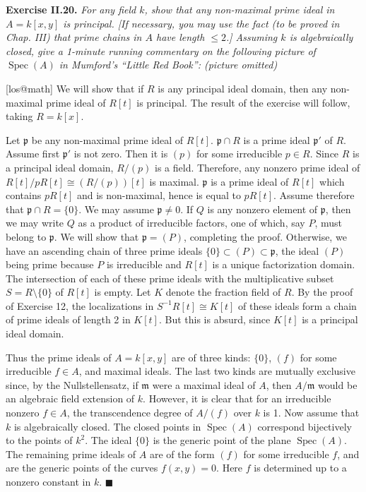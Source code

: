 \documentclass{article}
\makeatletter
\newcommand\<{\triangleleft}
\newcommand{\m}{\ensuremath{\mathfrak{m}}}
\newcommand\p{\mathfrak{p}}
\DeclareMathOperator{\spec}{Spec}
\newenvironment{exercise}[1]{\gdef\currentEx{#1}\begin{trivlist}\item[]%
                \textbf{Exercise #1.} \it}{\end{trivlist}}
\newenvironment{solution}[1]{\def\x{#1}\begin{trivlist}\item[]\hspace*{-.5em}[\x]}
                {\hspace*{\fill} $\blacksquare$
                \protected@write0{}{\currentEx, \x}
                \end{trivlist}}
\makeatother
\begin{document}
 \begin{exercise}{II.20}
   For any field $k$, show that any non-maximal prime ideal in $A=k[x,y]$ is principal.
   [If necessary, you may use the fact (to be proved in Chap. III) that prime chains in
   $A$ have length $\leq 2$.] Assuming $k$ is algebraically closed, give a 1-minute
   running commentary on the following picture of $\spec(A)$ in Mumford's ``Little Red
   Book'': (picture omitted)
 \end{exercise}
 \begin{solution}{los@math}
   We will show that if $R$ is any principal ideal domain, then any non-maximal prime
   ideal of $R[t]$ is principal. The result of the exercise will follow, taking $R=k[x]$.

   Let $\p$ be any non-maximal prime ideal of $R[t]$. $\p \cap R$ is a prime ideal $\p'$
   of $R$. Assume first $\p'$ is not zero. Then it is $(p)$ for some irreducible $p \in
   R$. Since $R$ is a principal ideal domain, $R/(p)$ is a field. Therefore, any nonzero
   prime ideal of $R[t]/pR[t] \cong (R/(p))[t]$ is maximal. $\p$ is a prime ideal of
   $R[t]$ which contains $pR[t]$ and is non-maximal, hence is equal to $pR[t]$. Assume
   therefore that $\p \cap R = \{0\}$. We may assume $\p \neq 0$. If $Q$ is any nonzero
   element of $\p$, then we may write $Q$ as a product of irreducible factors, one of
   which, say $P$, must belong to $\p$. We will show that $\p = (P)$, completing the
   proof. Otherwise, we have an ascending chain of three prime ideals $\{0\} \subset (P)
   \subset \p$, the ideal $(P)$ being prime because $P$ is irreducible and $R[t]$ is a
   unique factorization domain. The intersection of each of these prime ideals with the
   multiplicative subset $S = R \setminus \{0\}$ of $R[t]$ is empty. Let $K$ denote the
   fraction field of $R$. By the proof of Exercise 12, the localizations in $S^{-1}R[t]
   \cong K[t]$ of these ideals form a chain of prime ideals of length 2 in $K[t]$. But
   this is absurd, since $K[t]$ is a principal ideal domain.

   Thus the prime ideals of $A = k[x,y]$ are of three kinds: $\{0\}$, $(f)$ for some
   irreducible $f \in A$, and maximal ideals. The last two kinds are mutually exclusive
   since, by the Nullstellensatz, if $\m$ were a maximal ideal of $A$, then $A/\m$ would
   be an algebraic field extension of $k$. However, it is clear that for  an irreducible
   nonzero $f \in A$, the transcendence degree of $A/(f)$ over $k$ is 1. Now assume that
   $k$ is algebraically closed. The closed points in $\spec(A)$ correspond bijectively to
   the points of $k^2$. The ideal $\{0\}$ is the generic point of the plane $\spec(A)$.
   The remaining prime ideals of $A$ are of the form $(f)$ for some irreducible $f$, and
   are the generic points of the curves $f(x,y) = 0$. Here $f$ is determined up to a
   nonzero constant in $k$.
 \end{solution}
\end{document}
